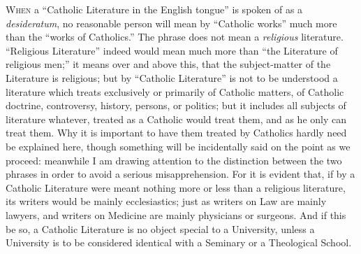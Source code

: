 W\textsc{hen} a ``Catholic Literature in the English tongue'' is
spoken of as a \emph{desideratum}, no reasonable person will mean by
``Catholic works'' much more than the ``works of
Catholics.'' The phrase does not mean a \emph{religious}
literature. ``Religious Literature'' indeed would mean much
more than ``the Literature of religious men;'' it means over
and above this, that the subject-matter of the Literature is
religious; but by ``Catholic Literature'' is not to be
understood a literature which treats exclusively or primarily of
Catholic matters, of Catholic doctrine, controversy, history, persons,
or politics; but it includes all subjects of literature whatever,
treated as a Catholic would treat them, and as he only can treat them.
Why it is important to have them treated by Catholics hardly need be
explained here, though something will be incidentally said on the
point as we proceed: meanwhile I am drawing attention to the
distinction between the two phrases in order to avoid a serious
misapprehension. For it is evident that, if by a Catholic Literature
were meant nothing more or less than a religious literature, its
writers would be mainly ecclesiastics; just as writers on Law are
mainly lawyers, and writers on Medicine are mainly physicians or
surgeons. And if this be so, a Catholic Literature is no object
special to a University, unless a University is to be considered
identical with a Seminary or a Theological School.

